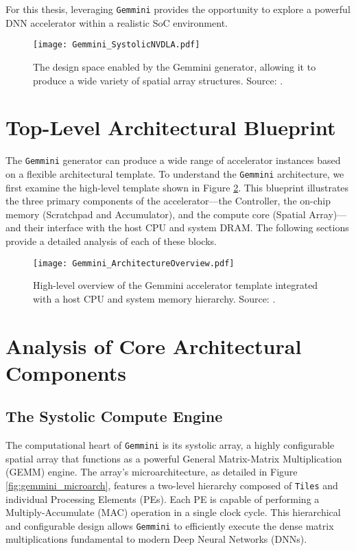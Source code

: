 For this thesis, leveraging \texttt{Gemmini} provides the opportunity to explore a powerful DNN accelerator within a realistic SoC environment.

\begin{figure}[h!]
    \centering
    \texttt{[image: Gemmini\_SystolicNVDLA.pdf]} 
    \caption[Architectural Flexibility of the Gemmini Generator]{The design space enabled by the Gemmini generator, allowing it to produce a wide variety of spatial array structures. Source: \cite{gemini-dac}.}
    \label{fig:gemmini_flexibility}
\end{figure}

\section{Top-Level Architectural Blueprint}
\label{sec:gemmini_blueprint}
The \texttt{Gemmini} generator can produce a wide range of accelerator instances based on a flexible architectural template. To understand the \texttt{Gemmini} architecture, we first examine the high-level template shown in Figure \ref{fig:gemmini_template}. This blueprint illustrates the three primary components of the accelerator---the Controller, the on-chip memory (Scratchpad and Accumulator), and the compute core (Spatial Array)---and their interface with the host CPU and system DRAM. The following sections provide a detailed analysis of each of these blocks.

\begin{figure}[htbp]
    \centering
    \texttt{[image: Gemmini\_ArchitectureOverview.pdf]}
    \caption{High-level overview of the Gemmini accelerator template integrated with a host CPU and system memory hierarchy. Source: \cite{gemini-dac}.}
    \label{fig:gemmini_template}
\end{figure}

\section{Analysis of Core Architectural Components}
\label{sec:gemmini_components}

\subsection{The Systolic Compute Engine}
The computational heart of \texttt{Gemmini} is its systolic array, a highly configurable spatial array that functions as a powerful General Matrix-Matrix Multiplication (GEMM) engine. The array's microarchitecture, as detailed in Figure \ref{fig:gemmini_microarch}, features a two-level hierarchy composed of \texttt{Tiles} and individual Processing Elements (PEs). Each PE is capable of performing a Multiply-Accumulate (MAC) operation in a single clock cycle. This hierarchical and configurable design allows \texttt{Gemmini} to efficiently execute the dense matrix multiplications fundamental to modern Deep Neural Networks (DNNs).

